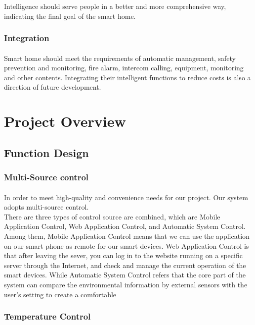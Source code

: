 \documentclass[a4paper,12pt]{article}
\begin{document}
Intelligence should serve people in a better and more comprehensive way, indicating the final goal of the smart home.\\\par

\subsubsection{Integration}
\paragraph{}
Smart home should meet the requirements of automatic management, safety prevention and monitoring, fire alarm, intercom calling, equipment, monitoring and other contents. Integrating their intelligent functions to reduce costs is also a direction of future development.

\section{Project Overview}
\subsection{Function Design}
\subsubsection{Multi-Source control}
\paragraph{}
In order to meet high-quality and convenience needs for our project. Our system adopts multi-source control. \\

There are three types of control source are combined, which are Mobile Application Control, Web Application Control, and Automatic System Control. Among them, Mobile Application Control means that we can use the application on our smart phone as remote for our smart devices. Web Application Control is that after leaving the sever, you can log in to the website running on a specific server through the Internet, and check and manage the current operation of the smart devices. While Automatic System Control refers that the core part of the system can compare the environmental information by external sensors with the user’s setting to create a comfortable

\subsubsection{Temperature Control}
\end{document}
